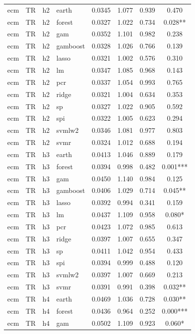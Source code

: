 \begin{ThreePartTable}
\begin{longtable}[t]{llclcccc}
\addlinespace
ecm & TR & h2 & earth & 0.0345 & 1.077 & 0.939 & 0.470\\
ecm & TR & h2 & forest & 0.0327 & 1.022 & 0.734 & 0.028**\\
ecm & TR & h2 & gam & 0.0352 & 1.101 & 0.982 & 0.238\\
ecm & TR & h2 & gamboost & 0.0328 & 1.026 & 0.766 & 0.139\\
ecm & TR & h2 & lasso & 0.0321 & 1.002 & 0.576 & 0.310\\
ecm & TR & h2 & lm & 0.0347 & 1.085 & 0.968 & 0.143\\
ecm & TR & h2 & pcr & 0.0337 & 1.054 & 0.993 & 0.765\\
ecm & TR & h2 & ridge & 0.0321 & 1.004 & 0.634 & 0.353\\
ecm & TR & h2 & sp & 0.0327 & 1.022 & 0.905 & 0.592\\
ecm & TR & h2 & spi & 0.0322 & 1.005 & 0.623 & 0.294\\
ecm & TR & h2 & svmlw2 & 0.0346 & 1.081 & 0.977 & 0.803\\
ecm & TR & h2 & svmr & 0.0324 & 1.012 & 0.688 & 0.194\\
\addlinespace
ecm & TR & h3 & earth & 0.0413 & 1.046 & 0.889 & 0.179\\
ecm & TR & h3 & forest & 0.0394 & 0.998 & 0.482 & 0.001***\\
ecm & TR & h3 & gam & 0.0450 & 1.140 & 0.984 & 0.125\\
ecm & TR & h3 & gamboost & 0.0406 & 1.029 & 0.714 & 0.045**\\
ecm & TR & h3 & lasso & 0.0392 & 0.994 & 0.341 & 0.159\\
ecm & TR & h3 & lm & 0.0437 & 1.109 & 0.958 & 0.080*\\
ecm & TR & h3 & pcr & 0.0423 & 1.072 & 0.985 & 0.613\\
ecm & TR & h3 & ridge & 0.0397 & 1.007 & 0.655 & 0.347\\
ecm & TR & h3 & sp & 0.0411 & 1.042 & 0.954 & 0.433\\
ecm & TR & h3 & spi & 0.0394 & 0.999 & 0.488 & 0.120\\
ecm & TR & h3 & svmlw2 & 0.0397 & 1.007 & 0.669 & 0.213\\
ecm & TR & h3 & svmr & 0.0391 & 0.991 & 0.398 & 0.032**\\
\addlinespace
ecm & TR & h4 & earth & 0.0469 & 1.036 & 0.728 & 0.030**\\
ecm & TR & h4 & forest & 0.0436 & 0.964 & 0.252 & 0.000***\\
ecm & TR & h4 & gam & 0.0502 & 1.109 & 0.923 & 0.060*\\

\end{longtable}
\end{ThreePartTable}
